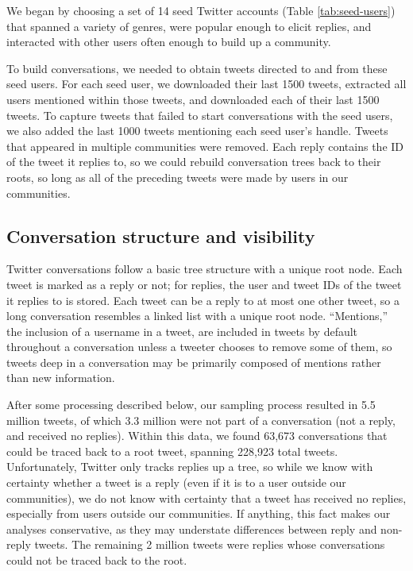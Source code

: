 \documentclass[11pt,letterpaper]{article}
\begin{document}
We began by choosing a set of 14 seed Twitter accounts (Table \ref{tab:seed-users}) that spanned a variety of genres, were popular enough to elicit replies, and interacted with other users often enough to build up a community. 

To build conversations, we needed to obtain tweets directed to and from these seed users. For each seed user, we downloaded their last 1500 tweets, extracted all users mentioned within those tweets, and downloaded each of their last 1500 tweets.  To capture tweets that failed to start conversations with the seed users, we also added the last 1000 tweets mentioning each seed user's handle.  Tweets that appeared in multiple communities were removed.  Each reply contains the ID of the tweet it replies to, so we could rebuild conversation trees back to their roots, so long as all of the preceding tweets were made by users in our communities.

\subsection{Conversation structure and visibility}\label{sect:conversation}

Twitter conversations follow a basic tree structure with a unique root node. Each tweet is marked as a reply or not; for replies, the user and tweet IDs of the tweet it replies to is stored. Each tweet can be a reply to at most one other tweet, so a long conversation resembles a linked list with a unique root node. ``Mentions,'' the inclusion of a username in a tweet, are included in tweets by default throughout a conversation unless a tweeter chooses to remove some of them, so tweets deep in a conversation may be primarily composed of mentions rather than new information.  


After some processing described below, our sampling process resulted in 5.5 million tweets, of which 3.3 million were not part of a conversation (not a reply, and received no replies).  Within this data, we found 63,673 conversations that could be traced back to a root tweet, spanning 228,923 total tweets. Unfortunately, Twitter only tracks replies up a tree, so while we know with certainty whether a tweet is a reply (even if it is to a user outside our communities), we do not know with certainty that a tweet has received no replies, especially from users outside our communities. If anything, this fact makes our analyses conservative, as they may understate differences between reply and non-reply tweets. The remaining 2 million tweets were replies whose conversations could not be traced back to the root.
\end{document}
